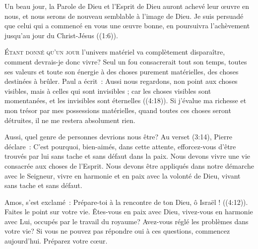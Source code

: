 Un beau jour, la Parole de Dieu et l'Esprit de Dieu auront achevé leur \oe{}uvre
 en nous, et nous serons de nouveau semblable à l'image de Dieu.
 \og Je suis persuadé que celui qui a commencé en vous une œuvre bonne,
 en poursuivra l'achèvement jusqu'au jour du Christ-Jésus \fg{}
 ((1:6)).

\dvrule






\lettrine{É}{tant donné qu'un jour} l'univers matériel va complètement
 disparaître, comment devrais-je donc vivre? Seul un fou consacrerait
 tout son temps, toutes ses valeurs et toute son énergie à des choses purement
 matérielles, des choses destinées à brûler. Paul a écrit~: 
 \og Aussi nous regardons, non point aux choses visibles,
 mais à celles qui sont invisibles ; car les choses visibles sont momentanées,
 et les invisibles sont éternelles \fg{} ((4:18)).
 Si j'évalue ma richesse et mon trésor par mes possessions matérielles,
 quand toutes ces choses seront détruites, il ne me restera absolument rien.

Aussi, quel genre de personnes devrions nous être? Au verset
 (3:14),
 Pierre déclare~: 
 \og C'est pourquoi, bien-aimés, dans cette attente,
 efforcez-vous d'être trouvés par lui sans tache et sans défaut
 dans la paix. \fg{}
 Nous devons vivre une vie consacrée aux choses de l'Esprit.
 Nous devons être appliqués dans notre démarche avec le Seigneur,
 vivre en harmonie et en paix avec la volonté de Dieu,
 vivant sans tache et sans défaut.


Amos, s'est exclamé~: 
 \og Prépare-toi à la rencontre de ton Dieu, ô Israël ! \fg{}
 ((4:12)).
 Faites le point sur votre vie. Êtes-vous en paix avec Dieu,
 vivez-vous en harmonie avec Lui, occupés par le travail du royaume?
 Avez-vous réglé les problèmes dans votre vie? Si vous ne pouvez pas répondre
 \og oui \fg{} à ces questions, commencez aujourd'hui. Préparez votre c\oe{}ur.

